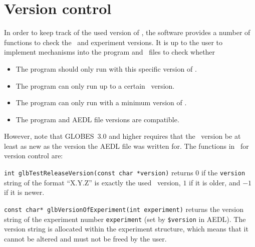 \section{Version control}
\label{sec:versioning}

In order to keep track of the used version of \GLOBES , the software
provides a number of functions to check the \GLOBES\ and experiment
versions. It is up to the user to implement mechanisms into the
program and \AEDL\ files to check whether
\begin{itemize}
\item
 The program should only run with this specific version of \GLOBES .
\item
 The program can only run up to a certain \GLOBES\ version.
\item
 The program can only run with a minimum version of \GLOBES .
\item
 The program and AEDL file versions are compatible.
\end{itemize}
However, note that GLOBES~3.0 and higher requires that the \GLOBES\ version be at least as new as the
version the AEDL file was written for.
%
The functions in \GLOBES\ for version control are:
\begin{function}
{\tt int glbTestReleaseVersion(const char *version)} returns $0$ if
the {\tt version} string of the format ``X.Y.Z'' is exactly the
used \GLOBES\ version, $1$ if it is older, and $-1$ if it is newer. 
\end{function}

\begin{function}
{\tt const char* glbVersionOfExperiment(int experiment)} returns
the version string of the experiment number {\tt experiment} (set by
{\tt \$version} in AEDL).
The version string is allocated within the experiment structure, which means
that it cannot be altered and must not be freed by the
user.
\end{function}


